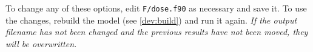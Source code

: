 \documentclass[10pt,a4paper]{article}
\begin{document}
To change any of these options, edit \verb|F/dose.f90| as necessary and save it.  To use the 
changes, rebuild the model (see \ref{dev:build}) and run it again.  \emph{If the output filename has 
not been changed and the previous results have not been moved, they will be overwritten.}


\end{document}
